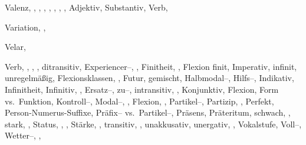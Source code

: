\begin{theindex}
  \item Valenz, , , , 
		, , , 
		, 
    \subitem Adjektiv, 
    \subitem Substantiv, 
    \subitem Verb, 
  \item Variation, , 
  \item Velar, 
  \item Verb, , , , 
    \subitem ditransitiv, 
    \subitem Experiencer--, , 
    \subitem Finitheit, , 
    \subitem Flexion
      \subsubitem finit, 
      \subsubitem Imperativ, 
      \subsubitem infinit, 
      \subsubitem unregelmäßig, 
    \subitem Flexionsklassen, , 
    \subitem Futur, 
    \subitem gemischt, 
    \subitem Halbmodal--, 
    \subitem Hilfs--, 
    \subitem Indikativ, 
    \subitem Infinitheit, 
    \subitem Infinitiv, , 
      \subsubitem Ersatz--, 
      \subsubitem zu--, 
    \subitem intransitiv, , 
    \subitem Konjunktiv, 
      \subsubitem Flexion, 
      \subsubitem Form vs.\ Funktion, 
    \subitem Kontroll--, 
    \subitem Modal--, , 
      \subsubitem Flexion, , 
    \subitem Partikel--, 
    \subitem Partizip, , 
    \subitem Perfekt, 
    \subitem Person-Numerus-Suffixe, 
    \subitem Präfix-- vs.\ Partikel--, 
    \subitem Präsens, 
    \subitem Präteritum, 
    \subitem schwach, , 
    \subitem stark, , 
    \subitem Status, , , 
    \subitem Stärke, , 
    \subitem transitiv, , 
    \subitem unakkusativ, 
    \subitem unergativ, , 
    \subitem Vokalstufe, 
    \subitem Voll--, 
    \subitem Wetter--, , 

\end{theindex}
